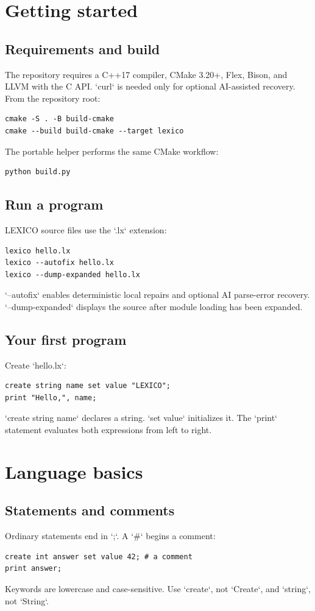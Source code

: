 \documentclass[10.5pt,a4paper]{article}
\begin{document}
\section{Getting started}
\subsection{Requirements and build}
The repository requires a C++17 compiler, CMake 3.20+, Flex, Bison, and LLVM with the C API. `curl` is needed only for optional AI-assisted recovery. From the repository root:
\begin{lstlisting}[language={}]
cmake -S . -B build-cmake
cmake --build build-cmake --target lexico
\end{lstlisting}
The portable helper performs the same CMake workflow:
\begin{lstlisting}[language={}]
python build.py
\end{lstlisting}
\subsection{Run a program}
LEXICO source files use the `.lx` extension:
\begin{lstlisting}[language={}]
lexico hello.lx
lexico --autofix hello.lx
lexico --dump-expanded hello.lx
\end{lstlisting}
`--autofix` enables deterministic local repairs and optional AI parse-error recovery. `--dump-expanded` displays the source after module loading has been expanded.
\subsection{Your first program}
Create `hello.lx`:
\begin{lstlisting}
create string name set value "LEXICO";
print "Hello,", name;
\end{lstlisting}
`create string name` declares a string. `set value` initializes it. The `print` statement evaluates both expressions from left to right.
\section{Language basics}
\subsection{Statements and comments}
Ordinary statements end in `;`. A `\#` begins a comment:
\begin{lstlisting}
create int answer set value 42; # a comment
print answer;
\end{lstlisting}
Keywords are lowercase and case-sensitive. Use `create`, not `Create`, and `string`, not `String`.
\end{document}
